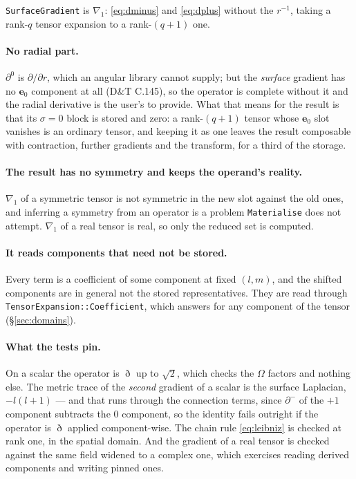 \documentclass[11pt,a4paper]{article}
\newcommand{\ebasis}[1]{\mathbf{e}_{#1}}
\newcommand{\code}[1]{\texttt{#1}}
\begin{document}
\code{SurfaceGradient} is $\nabla_1$: \eqref{eq:dminus} and
\eqref{eq:dplus} without the $r^{-1}$, taking a rank-$q$ tensor expansion
to a rank-$(q+1)$ one.

\paragraph{No radial part.}  $\partial^0$ is $\partial/\partial r$, which
an angular library cannot supply; but the \emph{surface} gradient has no
$\ebasis{0}$ component at all (D\&T C.145), so the operator is complete
without it and the radial derivative is the user's to provide.  What that
means for the result is that its $\sigma=0$ block is stored and zero: a
rank-$(q+1)$ tensor whose $\ebasis{0}$ slot vanishes is an ordinary
tensor, and keeping it as one leaves the result composable with
contraction, further gradients and the transform, for a third of the
storage.

\paragraph{The result has no symmetry and keeps the operand's reality.}
$\nabla_1$ of a symmetric tensor is not symmetric in the new slot against
the old ones, and inferring a symmetry from an operator is a problem
\code{Materialise} does not attempt.  $\nabla_1$ of a real tensor is real,
so only the reduced set is computed.

\paragraph{It reads components that need not be stored.}  Every term is a
coefficient of some component at fixed $(l,m)$, and the shifted components
are in general not the stored representatives.  They are read through
\code{TensorExpansion::Coefficient}, which answers for any component of
the tensor (\S\ref{sec:domains}).

\paragraph{What the tests pin.}  On a scalar the operator is $\eth$ up to
$\sqrt2$, which checks the $\Omega$ factors and nothing else.  The metric
trace of the \emph{second} gradient of a scalar is the surface Laplacian,
$-l(l+1)$ --- and that runs through the connection terms, since
$\partial^-$ of the $+1$ component subtracts the $0$ component, so the
identity fails outright if the operator is $\eth$ applied component-wise.
The chain rule \eqref{eq:leibniz} is checked at rank one, in the spatial
domain.  And the gradient of a real tensor is checked against the same
field widened to a complex one, which exercises reading derived components
and writing pinned ones.
\end{document}
